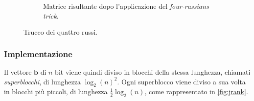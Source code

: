 \begin{figure}[ht]
\begin{subfigure}{0.32\textwidth}
\begin{tikzpicture}[x=0.75pt,y=0.75pt,yscale=-1,xscale=1]
		\end{tikzpicture}
		\caption{Matrice risultante dopo l'applicazione del \textit{four-russians trick}.}
	\end{subfigure}
	\caption{Trucco dei quattro russi.}
	\label{fig:frtrick}
\end{figure}

\subsubsection{Implementazione}
Il vettore $\mathbf{b}$  di $n$ bit viene quindi diviso in blocchi della
stessa lunghezza, chiamati \textit{superblocchi}, di lunghezza
$\log_2(n)^2$. Ogni superblocco viene
diviso a sua volta in blocchi più piccoli, di lunghezza $\frac{1}{2} \log_2(n)$,
come rappresentato in \cref{fig:jrank}.
\begin{figure}[ht]
	\centering

	\begin{tikzpicture}[x=0.75pt,y=0.75pt,yscale=-1,xscale=1]


\end{tikzpicture}
\end{figure}
